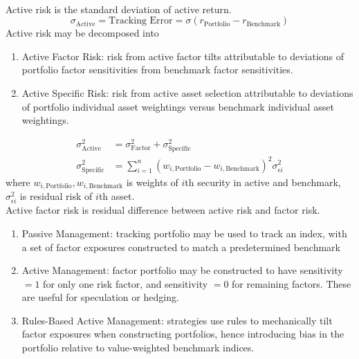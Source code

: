 \begin{remark} \\
Active risk is the standard deviation of active return.
\begin{equation}
\sigma_{\text{Active}} = \text{Tracking Error} = \sigma(r_{\text{Portfolio}} - r_{\text{Benchmark}}) \nonumber
\end{equation}
Active risk may be decomposed into
\begin{enumerate}[label=\roman*.]
\setlength{\itemsep}{0pt}
\item Active Factor Risk: risk from active factor tilts attributable to deviations of portfolio factor sensitivities from benchmark factor sensitivities.
\item Active Specific Risk: risk from active asset selection attributable to deviations of portfolio individual asset weightings versus benchmark individual asset weightings.
\end{enumerate}
\begin{align}
\sigma_{\text{Active}}^2 &= \sigma_{\text{Factor}}^2 + \sigma_{\text{Specific}}^2 \nonumber \\
\sigma_{\text{Specific}}^2 &= \sum\limits_{i=1}^n (w_{i, \text{Portfolio}} - w_{i, \text{Benchmark}})^2 \sigma^2_{\epsilon i} \nonumber
\end{align}
where $w_{i, \text{Portfolio}}, w_{i, \text{Benchmark}}$ is weights of $i$th security in active and benchmark, $\sigma^2_{\epsilon i}$ is residual risk of $i$th asset.\\
Active factor risk is residual difference between active risk and factor risk.
\end{remark}

\begin{remark} 
\begin{enumerate}[label=\roman*.]
\setlength{\itemsep}{0pt}
\item Passive Management: tracking portfolio may be used to track an index, with a set of factor exposures constructed to match a predetermined benchmark
\item Active Management: factor portfolio may be constructed to have sensitivity $=1$ for only one risk factor, and sensitivity $=0$ for remaining factors. These are useful for speculation or hedging.
\item Rules-Based Active Management: strategies use rules to mechanically tilt factor exposures when constructing portfolios, hence introducing bias in the portfolio relative to value-weighted benchmark indices.
\end{enumerate}
\end{remark}

